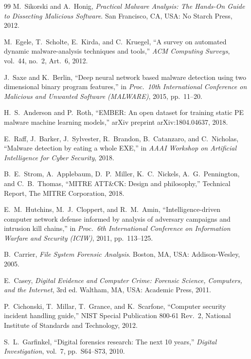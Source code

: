 \documentclass[12pt,a4paper,oneside]{article}
\begin{document}
\begin{thebibliography}{99}
 M.~Sikorski and A.~Honig, \emph{Practical Malware Analysis: The Hands-On Guide to Dissecting Malicious Software}. San Francisco, CA, USA: No Starch Press, 2012.

 M.~Egele, T.~Scholte, E.~Kirda, and C.~Kruegel, ``A survey on automated dynamic malware-analysis techniques and tools,'' \emph{ACM Computing Surveys}, vol.~44, no.~2, Art.\ 6, 2012.

 J.~Saxe and K.~Berlin, ``Deep neural network based malware detection using two dimensional binary program features,'' in \emph{Proc.\ 10th International Conference on Malicious and Unwanted Software (MALWARE)}, 2015, pp.\ 11--20.

 H.~S.~Anderson and P.~Roth, ``EMBER: An open dataset for training static PE malware machine learning models,'' arXiv preprint arXiv:1804.04637, 2018.

 E.~Raff, J.~Barker, J.~Sylvester, R.~Brandon, B.~Catanzaro, and C.~Nicholas, ``Malware detection by eating a whole EXE,'' in \emph{AAAI Workshop on Artificial Intelligence for Cyber Security}, 2018.

 B.~E.~Strom, A.~Applebaum, D.~P.~Miller, K.~C.~Nickels, A.~G.~Pennington, and C.~B.~Thomas, ``MITRE ATT\&CK: Design and philosophy,'' Technical Report, The MITRE Corporation, 2018.

 E.~M.~Hutchins, M.~J.~Cloppert, and R.~M.~Amin, ``Intelligence-driven computer network defense informed by analysis of adversary campaigns and intrusion kill chains,'' in \emph{Proc.\ 6th International Conference on Information Warfare and Security (ICIW)}, 2011, pp.\ 113--125.

 B.~Carrier, \emph{File System Forensic Analysis}. Boston, MA, USA: Addison-Wesley, 2005.

 E.~Casey, \emph{Digital Evidence and Computer Crime: Forensic Science, Computers, and the Internet}, 3rd ed. Waltham, MA, USA: Academic Press, 2011.

 P.~Cichonski, T.~Millar, T.~Grance, and K.~Scarfone, ``Computer security incident handling guide,'' NIST Special Publication 800-61 Rev.\ 2, National Institute of Standards and Technology, 2012.

 S.~L.~Garfinkel, ``Digital forensics research: The next 10 years,'' \emph{Digital Investigation}, vol.~7, pp.\ S64--S73, 2010.


\end{thebibliography}
\end{document}
